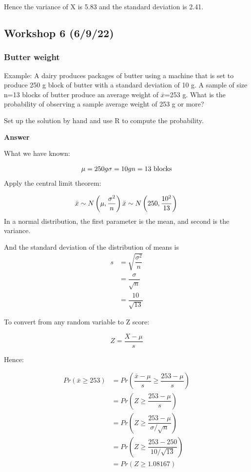 \documentclass[
]{article}
\begin{document}
Hence the variance of X is 5.83 and the standard deviation is 2.41.

\hypertarget{workshop-6-6922}{%
\subsection{Workshop 6 (6/9/22)}\label{workshop-6-6922}}

\hypertarget{butter-weight}{%
\subsubsection{Butter weight}\label{butter-weight}}

Example: A dairy produces packages of butter using a machine that is set
to produce 250 g block of butter with a standard deviation of 10 g. A
sample of size n=13 blocks of butter produce an average weight of
\(\bar{x}\)=253 g. What is the probability of observing a sample average
weight of 253 g or more?

Set up the solution by hand and use R to compute the probability.

\textbf{Answer}

What we have known:

\[
\mu = 250g\\
\sigma = 10g\\
n=13 \text{ blocks}
\] Apply the central limit theorem:

\[
\bar{x} \sim N\left(\mu, \dfrac{\sigma^2}{n}\right)\\
\bar{x} \sim N\left(250, \dfrac{10^2}{13}\right)\\
\] In a normal distribution, the first parameter is the mean, and second
is the variance.

And the standard deviation of the distribution of means is \[
\begin{aligned}
s &= \sqrt{\dfrac{\sigma^2}{n}} \\
&= \dfrac{\sigma}{\sqrt{n}} \\
&= \dfrac{10}{\sqrt{13}}
\end{aligned}
\]

To convert from any random variable to Z score:

\[
Z = \dfrac{X - \mu}{s}
\]

Hence:

\[
\begin{aligned}
Pr(\bar{x} \geq 253) &= Pr\left(\dfrac{\bar{x} - \mu}{s} \geq \dfrac{253 - \mu}{s}\right)\\
&= Pr\left(Z \geq \dfrac{253 - \mu}{s}\right)\\
&= Pr\left(Z \geq \dfrac{253 - \mu}{\sigma / \sqrt{n}}\right)\\
&= Pr\left(Z \geq \dfrac{253-250}{10/\sqrt{13}}\right)\\
&= Pr\left(Z \geq 1.08167\right)
\end{aligned}
\]
\end{document}
